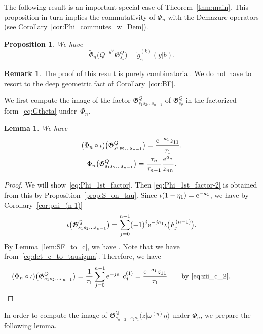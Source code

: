 \documentclass[pdftex]{sigma}
\numberwithin{equation}{section}
\newcommand{\Gro}[1]{\mathfrak{G}^Q_{#1}}
\newtheorem{Lemma}[Theorem]{Lemma}
\newtheorem{Proposition}[Theorem]{Proposition}
\theoremstyle{definition}
\newtheorem{Remark}[Theorem]{Remark}
\begin{document}
The following result is an important special case of Theorem~\ref{thm:main}.
This proposition in turn implies the commutativity of $\Phi_n$ with the Demazure operators (see Corollary~\ref{cor:Phi_commutes_w_Dem}).

\begin{Proposition}
\label{prop:key} We have
\[
\tilde{\Phi}_n\bigl(Q^{-\theta^\vee}\Gro{s_\theta}\bigr)=\tilde{g}_{s_0}^{(k)}(y|b).
\]
\end{Proposition}
\begin{Remark}The proof of this result is purely combinatorial.
We do not have to resort to
the deep geometric fact of Corollary~\ref{cor:BF}.
\end{Remark}

We first compute
the image of
the factor
$\Gro{s_1s_2\dots s_{n-1}}$ of $\Gro{s_\theta}$
in the factorized form~\eqref{eq:Gtheta} under~$\Phi_n$.
\begin{Lemma}\label{lem:Phi_1st_factor}
We have
\begin{gather}
 (\Phi_n\circ \iota)\bigl(\Gro{s_1s_2\dots s_{n-1}}\bigr)=
\frac{{\rm e}^{-a_1}z_{11}}{\tau_1},\label{eq:Phi_1st_factor}
 \\
 \Phi_n\bigl(\Gro{s_1s_2\dots s_{n-1}}\bigr)=
 \frac{\tau_n}{\tau_{n-1}}
 \frac{{\rm e}^{a_n}}{z_{nn}}.\label{eq:Phi_1st_factor-2}
\end{gather}
\end{Lemma}
\begin{proof}
 We will show~\eqref{eq:Phi_1st_factor}. Then
 \eqref{eq:Phi_1st_factor-2} is obtained from this by Proposition~\ref{prop:S_on_tau}.
Since $\iota(1-\eta_{1})={\rm e}^{-a_1}$, we have by Corollary~\ref{cor:phi_(n-1)}
\[
\iota\bigl(\Gro{s_1s_2\dots s_{n-1}}\bigr)=
\sum_{j=0}^{n-1}(-1)^j{\rm e}^{-ja_1}\iota\bigl(F_j^{(n-1)}\bigr).
\]
 By Lemma~\ref{lem:SF_to_c}, we have
.
Note that we have~ from~\eqref{eq:det_c_to_tausigma}.
Therefore, we have
\begin{align*}
(\Phi_n\circ \iota)
\bigl(\Gro{s_1s_2\dots s_{n-1}}\bigr)
&=\frac{1}{\tau_1}
\sum_{j=0}^{n-1}{\rm e}^{-ja_1}
c_j^{(1)}=\frac{{\rm e}^{-a_1}z_{11}}{\tau_1}
\qquad \text{by~\eqref{eq:zii_c_2}}.\tag*{\qed}
\end{align*}\renewcommand{\qed}{}
\end{proof}
 In order to compute the image of
 $\Gro{s_{n-2}\dots s_2s_{1}}\bigl(z|\omega^{(\eta)}\eta\bigr)$ under $\Phi_n$, we prepare
 the following lemma.
\end{document}
